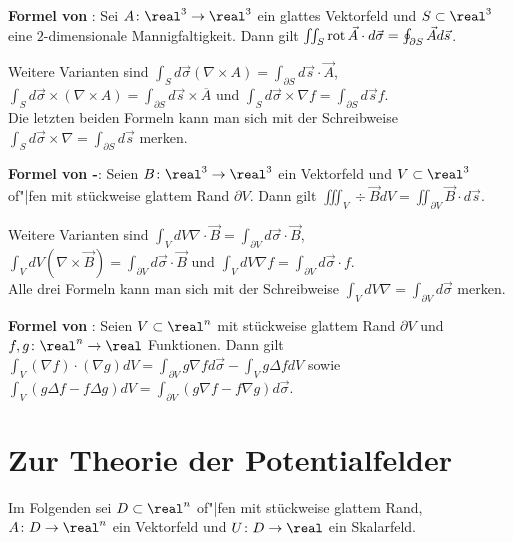 \linie

\textbf{Formel von }:
Sei $A\colon \real^3 \rightarrow \real^3$ ein glattes Vektorfeld und
$S \subset \real^3$ eine $2$-dimensionale Mannigfaltigkeit.
Dann gilt $\iint_S \operatorname{rot} \vec{A} \cdot d\vec{\sigma} =
\oint_{\partial S} \vec{A} d\vec{s}$.

Weitere Varianten sind
$\int_S d\vec{\sigma} (\nabla \times A) =
\int_{\partial S} d\vec{s} \cdot \vec{A}$, \\
$\int_S d\vec{\sigma} \times (\nabla \times A) =
\int_{\partial S} d\vec{s} \times \overline{A}$ \quad und \quad
$\int_S d\vec{\sigma} \times \nabla f =
\int_{\partial S} d\vec{s} f$. \\
Die letzten beiden Formeln kann man sich mit der Schreibweise
$\int_S d\vec{\sigma} \times \nabla = \int_{\partial S} d\vec{s}$
merken.

\linie

\textbf{Formel von -}:
Seien $B\colon \real^3 \rightarrow \real^3$ ein Vektorfeld und
$V \subset \real^3$ of"|fen mit stückweise glattem Rand $\partial V$.
Dann gilt $\iiint_V \div \vec{B} dV =
\iint_{\partial V} \vec{B} \cdot d\vec{s}$.

Weitere Varianten sind
$\int_V dV \nabla \cdot \vec{B} =
\int_{\partial V} d\vec{\sigma} \cdot \vec{B}$, \\
$\int_V dV (\nabla \times \vec{B}) =
\int_{\partial V} d\vec{\sigma} \cdot \vec{B}$ \quad und \quad
$\int_V dV \nabla f = \int_{\partial V} d\vec{\sigma} \cdot f$. \\
Alle drei Formeln kann man sich mit der Schreibweise
$\int_V dV \nabla = \int_{\partial V} d\vec{\sigma}$ merken.

\linie

\textbf{Formel von }:
Seien $V \subset \real^n$ mit stückweise glattem Rand $\partial V$ und
$f, g\colon \real^n \rightarrow \real$ Funktionen.
Dann gilt $\int_V (\nabla f) \cdot (\nabla g) dV =
\int_{\partial V} g \nabla f d\vec{\sigma} - \int_V g \Delta f dV$ sowie \\
$\int_V (g \Delta f - f \Delta g) dV =
\int_{\partial V} (g \nabla f - f \nabla g) d\vec{\sigma}$.

\section{%
    Zur Theorie der Potentialfelder%
}

Im Folgenden sei $D \subset \real^n$ of"|fen mit stückweise glattem Rand,
$A\colon D \rightarrow \real^n$ ein Vektorfeld und
$U\colon D \rightarrow \real$ ein Skalarfeld.

